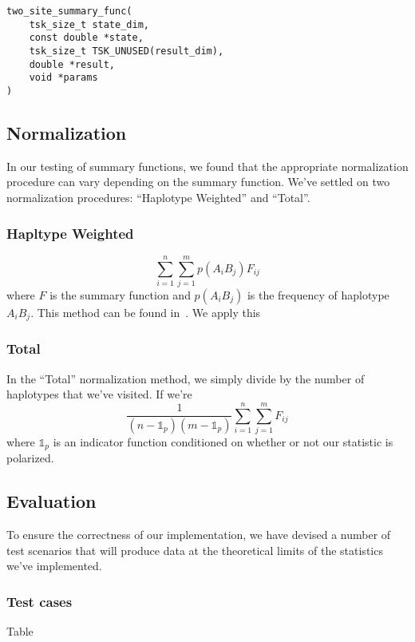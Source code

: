 \documentclass[12pt]{article}
\begin{document}
\begin{verbatim}
two_site_summary_func(
	tsk_size_t state_dim,
	const double *state,
	tsk_size_t TSK_UNUSED(result_dim),
	double *result,
	void *params
)
\end{verbatim}

\subsection{Normalization}
In our testing of summary functions, we found that the appropriate normalization
procedure can vary depending on the summary function. We've settled on two
normalization procedures: ``Haplotype Weighted'' and ``Total''.

\subsubsection{Hapltype Weighted}
\[
  \sum_{i=1}^{n}\sum_{j=1}^{m}p(A_{i}B_{j})F_{ij}
\]
where $F$ is the summary function and $p(A_{i}B_{j})$ is the frequency of
haplotype $A_{i}B_{j}$. This method can be found
in~\cite{zhao2007evaluation}. We apply this 
\subsubsection{Total}
In the ``Total'' normalization method, we simply divide by the number of
haplotypes that we've visited. If we're
\[
  \frac{1}{(n-\mathbb{1}_{p}) (m-\mathbb{1}_{p})}\sum_{i=1}^{n}\sum_{j=1}^{m}F_{ij}
\]
where $\mathbb{1}_{p}$ is an indicator function conditioned on whether or not
our statistic is polarized.

\subsection{Evaluation}
To ensure the correctness of our implementation, we have devised a number of
test scenarios that will produce data at the theoretical limits of the
statistics we've implemented.

\subsubsection{Test cases}
Table
\end{document}
